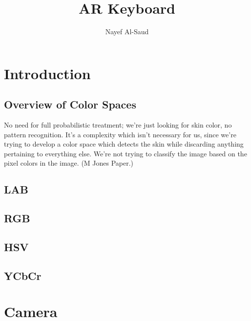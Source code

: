 \documentclass[10pt,a4paper]{article}
\author{Nayef Al-Saud}
\title{AR Keyboard}
\begin{document}
\newcommand{\fig}{fig. }
\maketitle
\begin{abstract}

\end{abstract}

\section{Introduction}\label{sec:Introduction}


\subsection{Overview of Color Spaces}\label{sec:OverviewOfColorSpaces}

No need for full probabilistic treatment; we're just looking for skin color, no pattern recognition. It's a complexity which isn't necessary for us, since we're trying to develop a color space which detects the skin while discarding anything pertaining to everything else. We're not trying to classify the image based on the pixel colors in the image. (M Jones Paper.)



\subsection{LAB}\label{sec:LAB}


\subsection{RGB}\label{sec:RGB}

\subsection{HSV}\label{sec:HSV}

\subsection{YCbCr}\label{sec:YCbCr}



\section{Camera}\label{sec:Camera}
\end{document}
